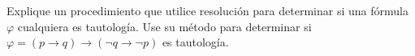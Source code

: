 Explique un procedimiento que utilice resolución para determinar si una fórmula $\varphi$ cualquiera es tautología. Use su método para determinar si
$\varphi=(p\rightarrow q)\rightarrow(\neg q\rightarrow\neg p)$
es tautología.